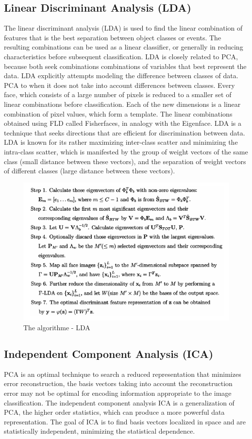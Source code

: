 	\subsection{Linear Discriminant Analysis (LDA)}
	The linear discriminant analysis (LDA) is used to find the linear combination of features that is the best separation between
object classes or events. The resulting combinations can be used
as a linear classifier, or generally in reducing characteristics before
subsequent classification.
LDA is closely related to PCA, because both seek combinations
combinations of variables that best represent the data. LDA explicitly attempts
modeling the difference between classes of data. PCA to when it does not take into account
differences between classes.
Every face, which consists of a large number of pixels is reduced to a smaller
set of linear combinations before classification.
Each of the new dimensions is a linear combination of pixel values, which
form a template. The linear combinations obtained using FLD called
Fisherfaces, in analogy with the Eigenface.
LDA is a technique that seeks directions that are efficient for discrimination
between data.
LDA is known for its rather maximizing inter-class scatter and minimizing the intra-class scatter, which is manifested by the group of weight vectors of the same class (small distance between these vectors), and the separation of weight vectors of different classes
(large distance between these vectors).
\begin{figure}[h]
\includegraphics[width=\columnwidth]{img/step.png}
\caption{The algorithme - LDA}
\end{figure}

\subsection{Independent Component Analysis (ICA)}
	PCA is an optimal technique to search a reduced representation that minimizes error
reconstruction, the basis vectors taking into account the reconstruction error
may not be optimal for encoding information appropriate to the image
classification. The independent component analysis ICA is a generalization of PCA, the higher order statistics, which can
produce a more powerful data representation.
The goal of ICA is to find basis vectors localized in space and are statistically independent, minimizing the statistical dependence.


